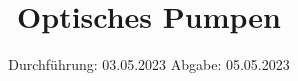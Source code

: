 

\subject{VERSUCH 21}
\title{Optisches Pumpen}
\date{%
  Durchführung: 03.05.2023
  \hspace{3em}
  Abgabe: 05.05.2023
}



\maketitle
\thispagestyle{empty}
\tableofcontents
\newpage







\printbibliography{}


